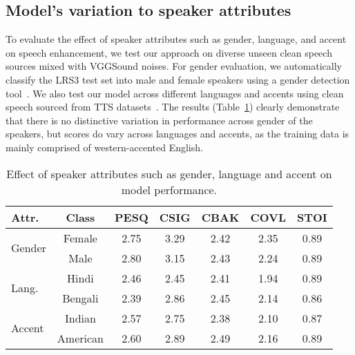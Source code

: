 \documentclass[10pt,twocolumn,letterpaper]{article}
\begin{document}
\vspace{-10pt}
\subsection{Model's variation to speaker attributes}

To evaluate the effect of speaker attributes such as gender, language, and accent on speech enhancement, we test our approach on diverse unseen clean speech sources mixed with VGGSound noises. For gender evaluation, we automatically classify the LRS3 test set into male and female speakers using a gender detection tool~\cite{ar2018cvlib}. We also test our model across different languages and accents using clean speech sourced from TTS datasets~\cite{ljspeech,iitmtts}. The results (Table~\ref{table:gender}) clearly demonstrate that there is no distinctive variation in performance across gender of the speakers, but scores do vary across languages and accents, as the training data is mainly comprised of western-accented English.


\begin{table}[ht]
    \centering
    \setlength{\tabcolsep}{3pt}
    \caption{Effect of speaker attributes such as gender, language and accent on model performance.}
    \begin{tabular}{lcccccc}
    \hline
 
    \textbf{Attr.} & \textbf{Class} & \textbf{PESQ} & \textbf{CSIG} & \textbf{CBAK} & \textbf{COVL} & \textbf{STOI}\\
    \hline
    
    \multirow{2}{*}{Gender} & Female & 2.75 & 3.29 & 2.42 & 2.35 & 0.89\\
    & Male & 2.80 & 3.15 & 2.43 & 2.24 & 0.89\\
    
    \hline
    
    \multirow{2}{*}{Lang.} & Hindi & 2.46 & 2.45 & 2.41 & 1.94 & 0.89\\
    & Bengali & 2.39 & 2.86 & 2.45 & 2.14 & 0.86\\
    
    \hline
    
    \multirow{2}{*}{Accent} & Indian & 2.57 & 2.75 & 2.38 & 2.10 & 0.87\\
    & American & 2.60 & 2.89 & 2.49 & 2.16 & 0.89\\
    \hline
    
    \end{tabular}
    \label{table:gender}
\end{table}
\end{document}
